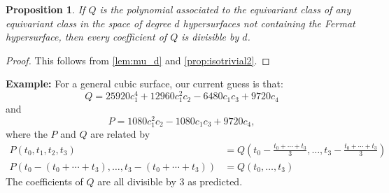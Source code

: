 \documentclass[12 pt]{amsart}
\newtheorem{proposition}{Proposition}[section]
\newenvironment{example}{\textbf{Example:}}{}
\newcommand{\<}{\left\langle}
\renewcommand{\>}{\right\rangle}
\begin{document}
\begin{proposition}
\label{prop:divd}
If $Q$ is the polynomial associated to the equivariant class of \emph{any} equivariant class in the space of degree $d$ hypersurfaces not containing the Fermat hypersurface, then every coefficient of $Q$ is divisible by $d$.
\end{proposition}

\begin{proof}
This follows from \autoref{lem:mu_d} and \autoref{prop:isotrivial2}.
\end{proof}

\begin{example}
For a general cubic surface, our current guess is that:
$$Q = 25920 c_1^4+12960 c_1^2 c_2-6480 c_1 c_3+9720 c_4$$
and
$$P = 1080 c_1^2 c_2-1080 c_1 c_3+9720 c_4,$$
where the $P$ and $Q$ are related by
\begin{align*}
P(t_0,t_1,t_2,t_3) &= Q(t_0 - \frac{t_0+\cdots+t_3}{3},\ldots, t_3 - \frac{t_0+\cdots+t_3}{3})\\
P(t_0 - (t_0+\cdots+t_3), \ldots, t_3 - (t_0+\cdots+t_3)) &= Q(t_0,\ldots,t_3)
\end{align*}
The coefficients of $Q$  are all divisible by 3 as predicted.
\end{example}


\end{document}
